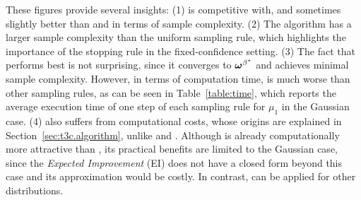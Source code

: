 These figures provide several insights: (1) \TCC is competitive with, and sometimes slightly better than \TTTS and \TTEI in terms of sample complexity. (2) The \UGapE algorithm has a larger sample complexity than the uniform sampling rule, which highlights the importance of the stopping rule in the fixed-confidence setting. (3) The fact that \DT performs best is not surprising, since it converges to ${\boldsymbol \omega}^{\beta^\star}$ and achieves minimal sample complexity. However, in terms of computation time, \DT is much worse than other sampling rules, as can be seen in Table~\ref{table:time}, which reports the average execution time of one step of each sampling rule for $\mu_1$ in the Gaussian case. (4) \TTTS also suffers from computational costs, whose origins are explained in Section~\ref{sec:t3c.algorithm}, unlike \TCC and \TTEI. 
Although \TTEI is already computationally more attractive than \TTTS, its practical benefits are limited to the Gaussian case, since the \emph{Expected Improvement} (EI) does not have a closed form beyond this case and its approximation would be costly. In contrast, \TCC can be applied for other distributions.
